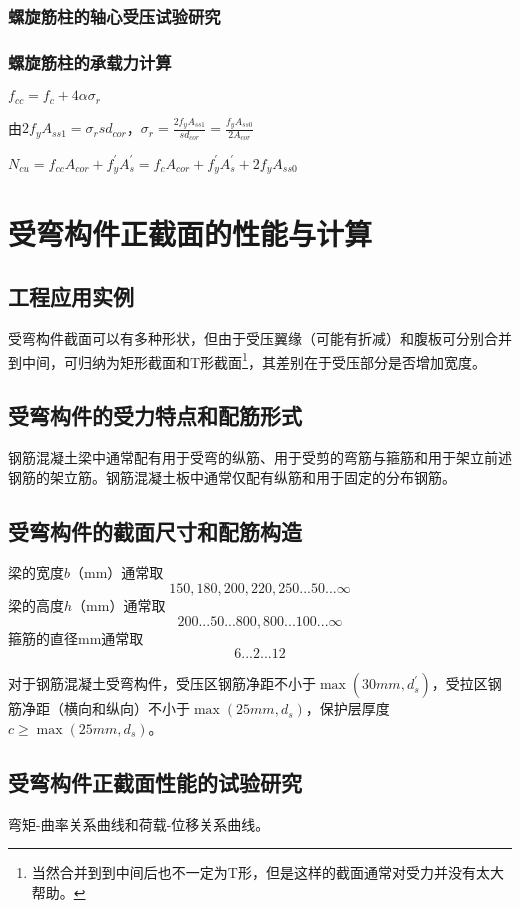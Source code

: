\documentclass{article}
\begin{document}
\subsubsection{螺旋筋柱的轴心受压试验研究}
\subsubsection{螺旋筋柱的承载力计算}
\par $f_{cc}=f_c+4\alpha\sigma_r$
\par 由$2f_yA_{ss1}=\sigma_rsd_{cor}$，$\sigma_r=\frac{2f_yA_{ss1}}{sd_{cor}}=\frac{f_yA_{ss0}}{2A_{cor}}$
\par $N_{cu}=f_{cc}A_{cor}+f_y^{\prime}A_s^{\prime}=f_cA_{cor}+f_y^{\prime}A_s^{\prime}+2f_yA_{ss0}$
\section{受弯构件正截面的性能与计算}
\subsection{工程应用实例}
\par 受弯构件截面可以有多种形状，但由于受压翼缘（可能有折减）和腹板可分别合并到中间，可归纳为矩形截面和T形截面\footnote{当然合并到到中间后也不一定为T形，但是这样的截面通常对受力并没有太大帮助。}，其差别在于受压部分是否增加宽度。
\subsection{受弯构件的受力特点和配筋形式}
\par 钢筋混凝土梁中通常配有用于受弯的纵筋、用于受剪的弯筋与箍筋和用于架立前述钢筋的架立筋。钢筋混凝土板中通常仅配有纵筋和用于固定的分布钢筋。
\subsection{受弯构件的截面尺寸和配筋构造}
\par 梁的宽度$b$（\unit{\mm}）通常取
$$
      150, 180, 200, 220, 250...50...\infty
$$
梁的高度$h$（\unit{\mm}）通常取
$$
      200...50...800,800...100...\infty
$$
箍筋的直径\unit{\mm}通常取
$$
      6...2...12
$$
\par 对于钢筋混凝土受弯构件，受压区钢筋净距不小于$\max(30mm, d_s^{\prime})$，受拉区钢筋净距（横向和纵向）不小于$\max(25mm, d_s)$，保护层厚度$c \ge \max(25mm, d_s)$。
\subsection{受弯构件正截面性能的试验研究}
\par 弯矩-曲率关系曲线和荷载-位移关系曲线。
\end{document}
